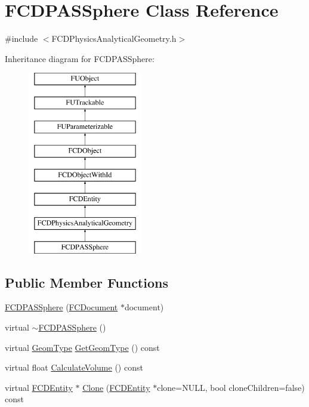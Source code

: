 \hypertarget{classFCDPASSphere}{
\section{FCDPASSphere Class Reference}
\label{classFCDPASSphere}
}


{\ttfamily \#include $<$FCDPhysicsAnalyticalGeometry.h$>$}

Inheritance diagram for FCDPASSphere:\begin{figure}[H]
\begin{center}
\leavevmode
\includegraphics[height=8.000000cm]{classFCDPASSphere}
\end{center}
\end{figure}
\subsection*{Public Member Functions}
\begin{DoxyCompactItemize}
\item 
\hyperlink{classFCDPASSphere_ab89e1b83bbf44c6c790b9bb38513d775}{FCDPASSphere} (\hyperlink{classFCDocument}{FCDocument} $\ast$document)
\item 
virtual \hyperlink{classFCDPASSphere_a9627e32c6a4f05cd9f0a88304e0c6d95}{$\sim$FCDPASSphere} ()
\item 
virtual \hyperlink{classFCDPhysicsAnalyticalGeometry_a511583406e5c6a1bb5bd84c0453a452c}{GeomType} \hyperlink{classFCDPASSphere_a7c3c557f235b2362784314887c4784e3}{GetGeomType} () const 
\item 
virtual float \hyperlink{classFCDPASSphere_a67cdef90f4d04d51cb93830b198d8486}{CalculateVolume} () const 
\item 
virtual \hyperlink{classFCDEntity}{FCDEntity} $\ast$ \hyperlink{classFCDPASSphere_a3714e903e359b1e0fb11daf84af1b018}{Clone} (\hyperlink{classFCDEntity}{FCDEntity} $\ast$clone=NULL, bool cloneChildren=false) const 
\end{DoxyCompactItemize}
